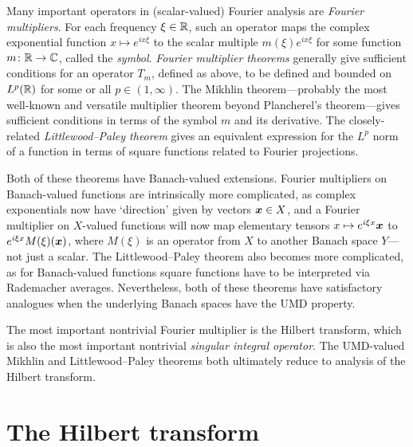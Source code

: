 Many important operators in (scalar-valued) Fourier analysis are \emph{Fourier multipliers}.
For each frequency $\xi \in \mathbb{R}$, such an operator maps the complex exponential function $x \mapsto e^{ix\xi}$ to the scalar multiple $m(\xi)e^{ix\xi}$ for some function $m \colon \mathbb{R} \rightarrow \mathbb{C}$, called the \emph{symbol}.
\emph{Fourier multiplier theorems} generally give sufficient conditions for an operator $T_{m}$, defined as above, to be defined and bounded on $L^{p}(\mathbb{R})$ for some or all $p \in (1,\infty)$.
The Mikhlin theorem---probably the most well-known and versatile multiplier theorem beyond Plancherel's theorem---gives sufficient conditions in terms of the symbol $m$ and its derivative.
The closely-related \emph{Littlewood--Paley theorem} gives an equivalent expression for the $L^p$ norm of a function in terms of square functions related to Fourier projections.

Both of these theorems have Banach-valued extensions.
Fourier multipliers on Banach-valued functions are intrinsically more complicated, as complex exponentials now have `direction' given by vectors $\bm{x} \in X$, and a Fourier multiplier on $X$-valued functions will now map elementary tensors $x \mapsto e^{i\xi x}\bm{x}$ to $e^{i\xi x}M(\xi)(\bm{x})$, where $M(\xi)$ is an operator from $X$ to another Banach space $Y$---not just a scalar.
The Littlewood--Paley theorem also becomes more complicated, as for Banach-valued functions square functions have to be interpreted via Rademacher averages.
Nevertheless, both of these theorems have satisfactory analogues when the underlying Banach spaces have the UMD property.

The most important nontrivial Fourier multiplier is the Hilbert transform, which is also the most important nontrivial \emph{singular integral operator}.
The UMD-valued Mikhlin and Littlewood--Paley theorems both ultimately reduce to analysis of the Hilbert transform.

\section{The Hilbert transform}

